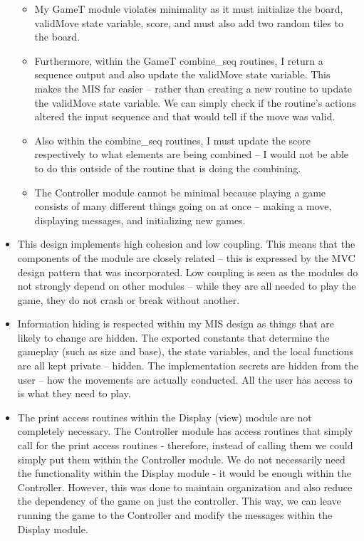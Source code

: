 \documentclass[12pt]{article}
\begin{document}
\begin{itemize}
    \begin{itemize}
        \item My GameT module violates minimality as it must initialize the board, validMove state variable, score, and must also add two random tiles to the board. 
        \item Furthermore, within the GameT combine\_seq routines, I return a sequence output and also update the validMove state variable. This makes the MIS far easier – rather than creating a new routine to update the validMove state variable. We can simply check if the routine’s actions altered the input sequence and that would tell if the move was valid. 
        \item Also within the combine\_seq routines, I must update the score respectively to what elements are being combined – I would not be able to do this outside of the routine that is doing the combining.
        \item The Controller module cannot be minimal because playing a game consists of many different things going on at once – making a move, displaying messages, and initializing new games.
    \end{itemize}
    \newpage
    \item This design implements high cohesion and low coupling. This means that the components of the module are closely related – this is expressed by the MVC design pattern that was incorporated. Low coupling is seen as the modules do not strongly depend on other modules – while they are all needed to play the game, they do not crash or break without another.
    \item Information hiding is respected within my MIS design as things that are likely to change are hidden. The exported constants that determine the gameplay (such as size and base), the state variables, and the local functions are all kept private – hidden. The implementation secrets are hidden from the user – how the movements are actually conducted. All the user has access to is what they need to play.
    \item The print access routines within the Display (view) module are not completely necessary. The Controller module has access routines that simply call for the print access routines - therefore, instead of calling them we could simply put them within the Controller module. We do not necessarily need the functionality within the Display module - it would be enough within the Controller. However, this was done to maintain organization and also reduce the dependency of the game on just the controller. This way, we can leave running the game to the Controller and modify the messages within the Display module.

\end{itemize}
\end{document}
